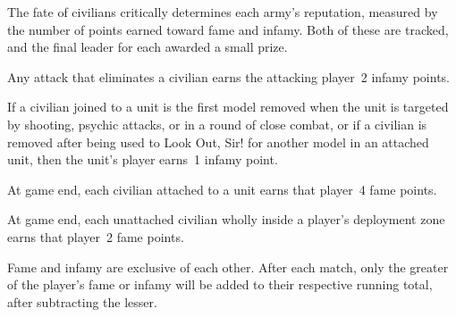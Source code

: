 The fate of civilians critically determines each army's reputation,
measured by the number of points earned toward fame and infamy.  Both
of these are tracked, and the final leader for each awarded a small
prize.

  Any attack that eliminates a
civilian earns the attacking player~2 infamy points.

  If a civilian joined to a unit is
the first model removed when the unit is targeted by shooting, psychic
attacks, or in a round of close combat, or if a civilian is removed
after being used to Look Out, Sir! for another model in an attached
unit, then the unit's player earns~1 infamy point.

  At game end, each civilian
attached to a unit earns that player~4 fame points.

  At game end, each unattached civilian
wholly inside a player's deployment zone earns that player~2 fame
points.

  Fame and infamy are exclusive of
each other.  After each match, only the greater of the player's fame
or infamy will be added to their respective running total, after
subtracting the lesser.
